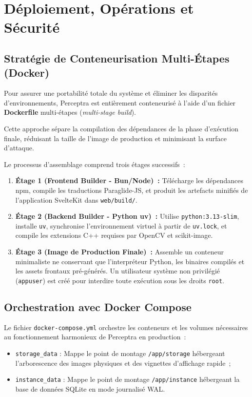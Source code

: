 \chapter{Déploiement, Opérations et Sécurité}
\label{chap:deploiement}

\section{Stratégie de Conteneurisation Multi-Étapes (Docker)}

Pour assurer une portabilité totale du système et éliminer les disparités d'environnements, Perceptra est entièrement conteneurisé à l'aide d'un fichier \textbf{Dockerfile} multi-étapes (\textit{multi-stage build}).

Cette approche sépare la compilation des dépendances de la phase d'exécution finale, réduisant la taille de l'image de production et minimisant la surface d'attaque.

Le processus d'assemblage comprend trois étages successifs~:
\begin{enumerate}
    \item \textbf{Étage 1 (Frontend Builder - Bun/Node)~:} Télécharge les dépendances npm, compile les traductions Paraglide-JS, et produit les artefacts minifiés de l'application SvelteKit dans \texttt{web/build/}.
    \item \textbf{Étage 2 (Backend Builder - Python uv)~:} Utilise \texttt{python:3.13-slim}, installe \texttt{uv}, synchronise l'environnement virtuel à partir de \texttt{uv.lock}, et compile les extensions C++ requises par OpenCV et scikit-image.
    \item \textbf{Étage 3 (Image de Production Finale)~:} Assemble un conteneur minimaliste ne conservant que l'interpréteur Python, les binaires compilés et les assets frontaux pré-générés. Un utilisateur système non privilégié (\texttt{appuser}) est créé pour interdire toute exécution sous les droits \texttt{root}.
\end{enumerate}

\section{Orchestration avec Docker Compose}

Le fichier \texttt{docker-compose.yml} orchestre les conteneurs et les volumes nécessaires au fonctionnement harmonieux de Perceptra en production~:
\begin{itemize}
    \item \texttt{storage\_data} : Mappe le point de montage \texttt{/app/storage} hébergeant l'arborescence des images physiques et des vignettes d'affichage rapide~;
    \item \texttt{instance\_data} : Mappe le point de montage \texttt{/app/instance} hébergeant la base de données SQLite en mode journalisé WAL.
\end{itemize}

